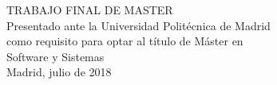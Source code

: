 \begin{titlepage}
\begin{center}
        \vfill

        TRABAJO FINAL DE MASTER\\
        Presentado ante la Universidad Politécnica de Madrid\\
        como requisito para optar al título de Máster en\\
        Software y Sistemas\\

        \vfill
        Madrid, julio de 2018
    \end{center}
\end{titlepage}

\newpage
